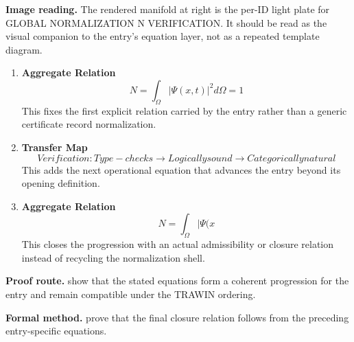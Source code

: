 \begin{samepage}
\noindent\begin{minipage}[t]{0.45\linewidth}
\vspace{0pt}
\raggedright
\scriptsize\textbf{Image reading.} The rendered manifold at right is the per-ID light plate for GLOBAL NORMALIZATION N VERIFICATION. It should be read as the visual companion to the entry's equation layer, not as a repeated template diagram.\par
\end{minipage}\hfill
\begin{minipage}[t]{0.53\linewidth}
\vspace*{-0.10in}
\raggedright
{}
\end{minipage}
\end{samepage}

\clearpage


\begin{enumerate}[leftmargin=1.6em,itemsep=9pt,topsep=6pt]
\item \textbf{Aggregate Relation}
\[
N = \int_\Omega |\Psi(x, t)|^2 d\Omega = 1
\]
This fixes the first explicit relation carried by the entry rather than a generic certificate record normalization.

\item \textbf{Transfer Map}
\[
Verification: Type-checks \to Logically sound \to Categorically natural
\]
This adds the next operational equation that advances the entry beyond its opening definition.

\item \textbf{Aggregate Relation}
\[
N = \int_\Omega |\Psi(x
\]
This closes the progression with an actual admissibility or closure relation instead of recycling the normalization shell.
\end{enumerate}

\textbf{Proof route.} show that the stated equations form a coherent progression for the entry and remain compatible under the TRAWIN ordering.

\textbf{Formal method.} prove that the final closure relation follows from the preceding entry-specific equations.

\medskip
{}

